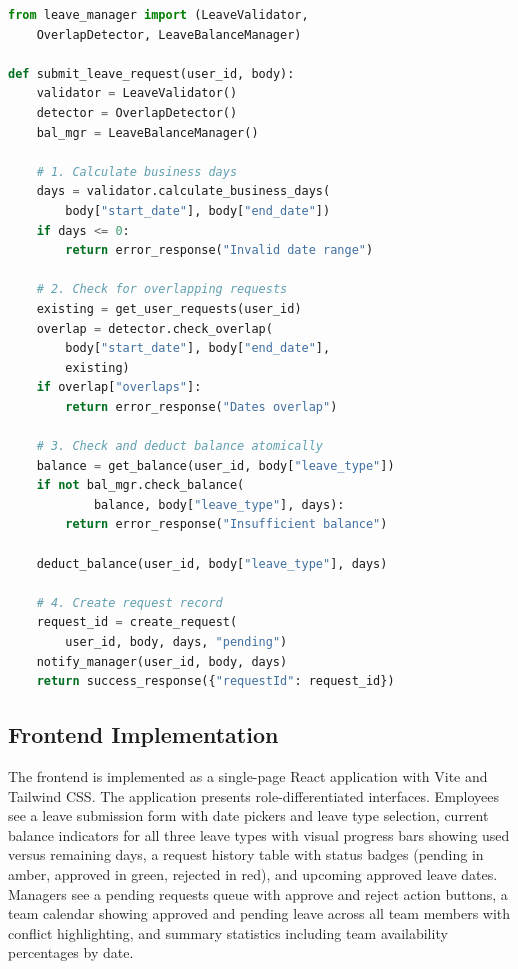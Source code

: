 \documentclass[conference]{IEEEtran}
\begin{document}
\begin{lstlisting}[language=Python, caption={Leave request submission with validation chain}]
from leave_manager import (LeaveValidator,
    OverlapDetector, LeaveBalanceManager)

def submit_leave_request(user_id, body):
    validator = LeaveValidator()
    detector = OverlapDetector()
    bal_mgr = LeaveBalanceManager()

    # 1. Calculate business days
    days = validator.calculate_business_days(
        body["start_date"], body["end_date"])
    if days <= 0:
        return error_response("Invalid date range")

    # 2. Check for overlapping requests
    existing = get_user_requests(user_id)
    overlap = detector.check_overlap(
        body["start_date"], body["end_date"],
        existing)
    if overlap["overlaps"]:
        return error_response("Dates overlap")

    # 3. Check and deduct balance atomically
    balance = get_balance(user_id, body["leave_type"])
    if not bal_mgr.check_balance(
            balance, body["leave_type"], days):
        return error_response("Insufficient balance")

    deduct_balance(user_id, body["leave_type"], days)

    # 4. Create request record
    request_id = create_request(
        user_id, body, days, "pending")
    notify_manager(user_id, body, days)
    return success_response({"requestId": request_id})
\end{lstlisting}

\subsection{Frontend Implementation}

The frontend is implemented as a single-page React application with Vite and Tailwind CSS. The application presents role-differentiated interfaces. Employees see a leave submission form with date pickers and leave type selection, current balance indicators for all three leave types with visual progress bars showing used versus remaining days, a request history table with status badges (pending in amber, approved in green, rejected in red), and upcoming approved leave dates. Managers see a pending requests queue with approve and reject action buttons, a team calendar showing approved and pending leave across all team members with conflict highlighting, and summary statistics including team availability percentages by date.
\end{document}

